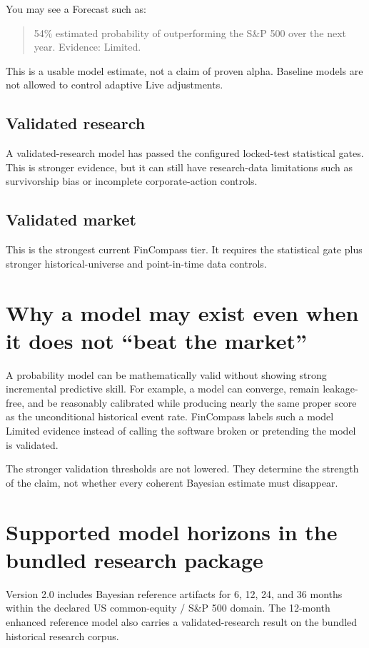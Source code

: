 \documentclass[11pt]{article}
\begin{document}
You may see a Forecast such as:
\begin{quote}
54\% estimated probability of outperforming the S\&P 500 over the next year. Evidence: Limited.
\end{quote}
This is a usable model estimate, not a claim of proven alpha. Baseline models are not allowed to control adaptive Live adjustments.

\subsection{Validated research}
A validated-research model has passed the configured locked-test statistical gates. This is stronger evidence, but it can still have research-data limitations such as survivorship bias or incomplete corporate-action controls.

\subsection{Validated market}
This is the strongest current FinCompass tier. It requires the statistical gate plus stronger historical-universe and point-in-time data controls.

\section{Why a model may exist even when it does not ``beat the market''}
A probability model can be mathematically valid without showing strong incremental predictive skill. For example, a model can converge, remain leakage-free, and be reasonably calibrated while producing nearly the same proper score as the unconditional historical event rate. FinCompass labels such a model Limited evidence instead of calling the software broken or pretending the model is validated.

The stronger validation thresholds are not lowered. They determine the strength of the claim, not whether every coherent Bayesian estimate must disappear.

\section{Supported model horizons in the bundled research package}
Version 2.0 includes Bayesian reference artifacts for 6, 12, 24, and 36 months within the declared US common-equity / S\&P 500 domain. The 12-month enhanced reference model also carries a validated-research result on the bundled historical research corpus.
\end{document}
